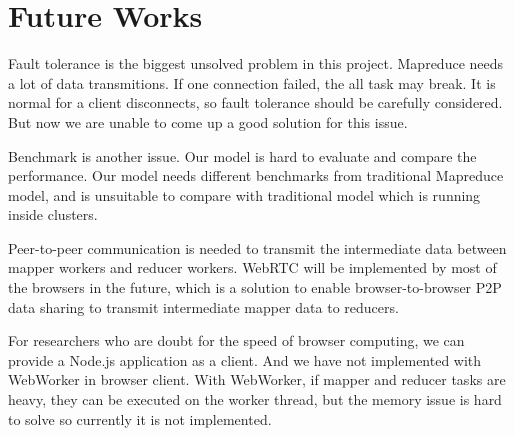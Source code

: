\section{Future Works}

Fault tolerance is the biggest unsolved problem in this project. Mapreduce needs a lot of data transmitions. If one connection failed, the all task may break. It is normal for a client disconnects, so fault tolerance should be carefully considered. But now we are unable to come up a good solution for this issue.

Benchmark is another issue. Our model is hard to evaluate and compare the performance. Our model needs different benchmarks from traditional Mapreduce model, and is unsuitable to compare with traditional model which is running inside clusters.

Peer-to-peer communication is needed to transmit the intermediate data between mapper workers and reducer workers. WebRTC will be implemented by most of the browsers in the future, which is a solution to enable browser-to-browser P2P data sharing to transmit intermediate mapper data to reducers.

For researchers who are doubt for the speed of browser computing, we can provide a Node.js application as a client. And we have not implemented with WebWorker\cite{webworker} in browser client. With WebWorker, if mapper and reducer tasks are heavy, they can be executed on the worker thread, but the memory issue is hard to solve so currently it is not implemented.